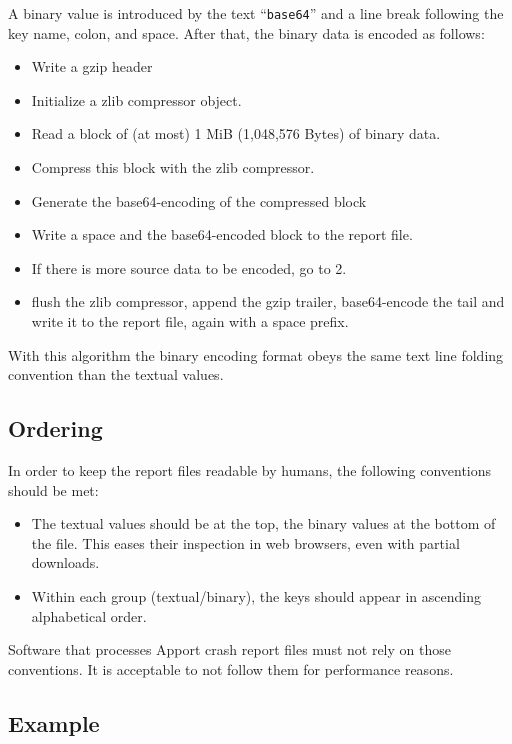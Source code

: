 \documentclass[DIV12,halfparskip]{scrartcl}
\begin{document}
A binary value is introduced by the text ``\verb!base64!'' and a line break
following the key name, colon, and space. After that, the binary data is
encoded as follows:

\begin{itemize}
    \item Write a gzip header
    \item Initialize a zlib compressor object.
    \item Read a block of (at most) 1 MiB (1,048,576 Bytes) of binary data.
    \item Compress this block with the zlib compressor.
    \item Generate the base64-encoding of the compressed block
    \item Write a space and the base64-encoded block to the report file.
    \item If there is more source data to be encoded, go to 2.
    \item flush the zlib compressor, append the gzip trailer, base64-encode the
    tail and write it to the report file, again with a space prefix.
\end{itemize}

With this algorithm the binary encoding format obeys the same text line folding
convention than the textual values.

\subsection{Ordering}

In order to keep the report files readable by humans, the following conventions
should be met:

\begin{itemize}
    \item The textual values should be at the top, the binary values at the
    bottom of the file. This eases their inspection in web browsers, even with
    partial downloads.
    \item Within each group (textual/binary), the keys should appear in
    ascending alphabetical order.
\end{itemize}

Software that processes Apport crash report files must not rely on those
conventions. It is acceptable to not follow them for performance reasons.

\subsection{Example}
\end{document}
